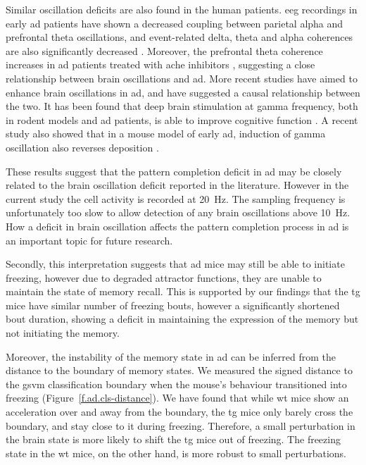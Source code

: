 Similar oscillation deficits are also found in the human patients. \Gls{eeg} recordings in early \gls{ad} patients have shown a decreased coupling between parietal alpha and prefrontal theta oscillations, and event-related delta, theta and alpha coherences are also significantly decreased \citep{guntekin08, montez09}. Moreover, the prefrontal theta coherence increases in \gls{ad} patients treated with \gls{ache} inhibitors \citep{yener07}, suggesting a close relationship between brain oscillations and \gls{ad}. More recent studies have aimed to enhance brain oscillations in \gls{ad}, and have suggested a causal relationship between the two. It has been found that deep brain stimulation at gamma frequency, both in rodent models and \gls{ad} patients, is able to improve cognitive function \citep{suthana14}. A recent study also showed that in a mouse model of early \gls{ad}, induction of gamma oscillation also reverses \abeta{} deposition \citep{iaccarino16}. 

These results suggest that the pattern completion deficit in \gls{ad} may be closely related to the brain oscillation deficit reported in the literature. However in the current study the cell activity is recorded at \SI{20}{\hertz}. The sampling frequency is unfortunately too slow to allow detection of any brain oscillations above \SI{10}{\hertz}. How a deficit in brain oscillation affects the pattern completion process in \gls{ad} is an important topic for future research. 

Secondly, this interpretation suggests that \gls{ad} mice may still be able to initiate freezing, however due to degraded attractor functions, they are unable to maintain the state of memory recall. This is supported by our findings that the \gls{tg} mice have similar number of freezing bouts, however a significantly shortened bout duration, showing a deficit in maintaining the expression of the memory but not initiating the memory. 

Moreover, the instability of the memory state in \gls{ad} can be inferred from the distance to the boundary of memory states. We measured the signed distance to the \gls{gsvm} classification boundary when the mouse's behaviour transitioned into freezing (Figure~\ref{f.ad.cls-distance}). We have found that while \gls{wt} mice show an acceleration over and away from the boundary, the \gls{tg} mice only barely cross the boundary, and stay close to it during freezing. Therefore, a small perturbation in the brain state is more likely to shift the \gls{tg} mice out of freezing. The freezing state in the \gls{wt} mice, on the other hand, is more robust to small perturbations.  

